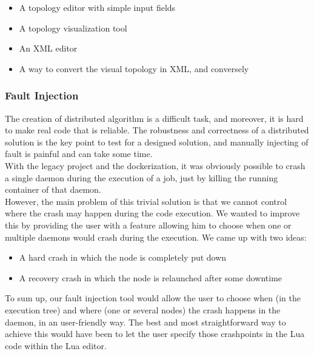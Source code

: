 \documentclass{eplmastersthesis}
\begin{document}
          \begin{itemize}
            \item A topology editor with simple input fields
            \item A topology visualization tool
            \item An XML editor
            \item A way to convert the visual topology in XML, and conversely
          \end{itemize}

        \subsubsection{Fault Injection}

          The creation of distributed algorithm is a difficult task, and
          moreover, it is hard to make real code that is reliable. The robustness
          and correctness of a distributed solution is the key point to test
          for a designed solution, and manually injecting of fault is painful
          and can take some time. \\

          With the legacy project and the dockerization, it was obviously
          possible to crash a single daemon during the execution of a job, just
          by killing the running container of that daemon.\\
          However, the main problem of this trivial solution is that we cannot
          control where the crash may happen during the code execution.
          We wanted to improve this by providing the user with a feature
          allowing him to choose when one or multiple daemons would crash during
          the execution. We came up with two ideas:

          \begin{itemize}
            \item A hard crash in which the node is completely put down
            \item A recovery crash in which the node is relaunched after some
            downtime
          \end{itemize}

          To sum up, our fault injection tool would allow the user to choose
          when (in the execution tree) and where (one or several nodes) the
          crash happens in the daemon, in an user-friendly way. The best and
          most straightforward way to achieve this would have been to let
          the user specify those crashpoints in the Lua code within the Lua
          editor.
\end{document}
